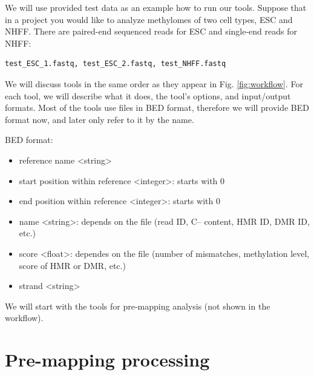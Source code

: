 \documentclass{article}
\begin{document}
We will use provided test data as an example how to run our tools.
 Suppose that in
a project you would like to analyze methylomes of two
cell types, ESC and NHFF. There are paired-end sequenced reads for ESC
and single-end reads for NHFF: 
\begin{verbatim}
test_ESC_1.fastq, test_ESC_2.fastq, test_NHFF.fastq
\end{verbatim}
We will discuss tools in the same order as they appear in Fig. \ref{fig:workflow}. For each
tool, we will describe what it does, the tool's options, and input/output formats.
Most of the tools use files in BED format, therefore we will provide BED format now, and 
later only refer to it by the name.


BED format:
\begin{itemize}
\item
reference name \textless string\textgreater
\item
start position within reference \textless integer\textgreater: starts with 0
\item
end position within reference \textless integer\textgreater: starts with 0
\item
name \textless string\textgreater : depends on the file (read ID, C-- content, HMR ID, DMR ID, etc.)
\item
score \textless float\textgreater : dependes on the file (number of mismatches, methylation level, score of HMR or DMR, etc.)
\item
strand \textless string\textgreater
\end{itemize}

\begin{flushleft}We will start with the tools for pre-mapping analysis (not shown in the workflow).
\end{flushleft}

\section{Pre-mapping processing}
\label{sec:premapping}
\end{document}
